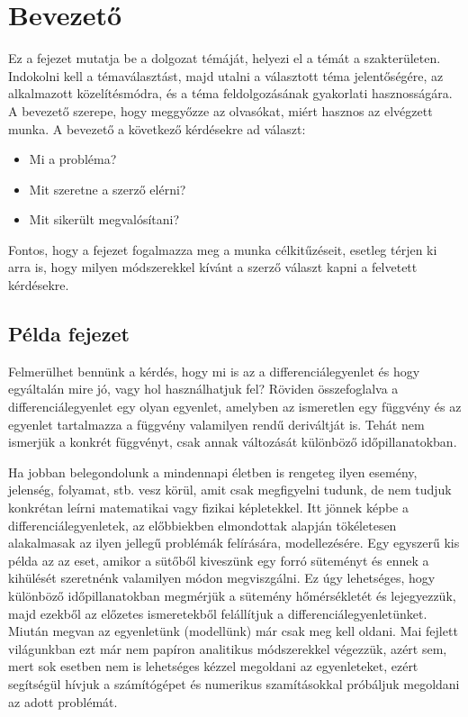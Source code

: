 \chapter{Bevezető}%

Ez a fejezet mutatja be a dolgozat témáját, helyezi el a témát a szakterületen. Indokolni kell a témaválasztást, majd utalni a választott téma jelentőségére, az alkalmazott közelítésmódra, és a téma feldolgozásának gyakorlati hasznosságára. A bevezető szerepe, hogy meggyőzze az olvasókat, miért hasznos az elvégzett munka. 
A bevezető a következő kérdésekre ad választ:

\begin{itemize}
\item Mi a probléma?
\item Mit szeretne a szerző elérni?
\item Mit sikerült megvalósítani?
\end{itemize}


Fontos, hogy a fejezet fogalmazza meg a munka célkitűzéseit, esetleg térjen ki arra is, hogy milyen módszerekkel kívánt a szerző választ kapni a felvetett kérdésekre. 


\section{P\'elda fejezet}


Felmerülhet bennünk a kérdés, hogy mi is az a differenciálegyenlet és hogy egyáltalán mire jó, vagy hol használhatjuk fel? Röviden összefoglalva a differenciálegyenlet egy olyan egyenlet, amelyben az ismeretlen egy függvény és az egyenlet tartalmazza a függvény valamilyen rendű deriváltját is. Tehát nem ismerjük a konkrét függvényt, csak annak változását különböző időpillanatokban.

Ha jobban belegondolunk a mindennapi életben is rengeteg ilyen esemény, jelenség, folyamat, stb. vesz körül, amit csak megfigyelni tudunk, de nem tudjuk konkrétan leírni matematikai vagy fizikai képletekkel. Itt jönnek képbe a differenciálegyenletek, az előbbiekben elmondottak alapján tökéletesen alakalmasak az ilyen jellegű problémák felírására, modellezésére. Egy egyszerű kis példa az az eset, amikor a sütőből kiveszünk egy forró süteményt és ennek a kihülését szeretnénk valamilyen módon megviszgálni. Ez úgy lehetséges, hogy különböző időpillanatokban megmérjük a sütemény hőmérsékletét és lejegyezzük, majd ezekből az előzetes ismeretekből felállítjuk a differenciálegyenletünket. Miután megvan az egyenletünk (modellünk) már csak meg kell oldani. Mai fejlett világunkban ezt már nem papíron analitikus módszerekkel végezzük, azért sem, mert sok esetben nem is lehetséges kézzel megoldani az egyenleteket, ezért segítségül hívjuk a számítógépet és numerikus szamításokkal próbáljuk megoldani az adott problémát.

